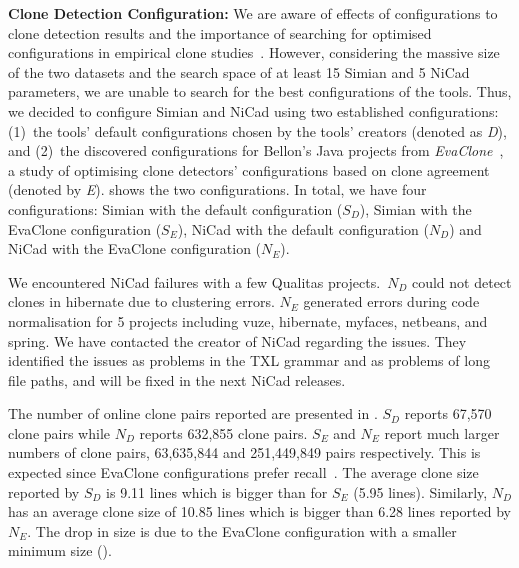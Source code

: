 \documentclass[sigconf,review, anonymous]{acmart}
\begin{document}
\textbf{Clone Detection Configuration: }
We are aware of effects of configurations to clone detection results
and the importance of searching for optimised configurations in
empirical clone
studies~\cite{Svajlenko2014,Wang2014,cr2016ssbse,Ragkhitwetsagul2016}. However,
considering the massive size of the two datasets and the search space
of at least 15 Simian and 5 NiCad parameters, we are unable to search
for the best configurations of the tools. Thus, we decided to
configure Simian and NiCad using two established configurations:
(1)~the tools' default configurations chosen by the tools' creators
(denoted as \textit{D}), and (2)~the discovered configurations for
Bellon's Java projects from \textit{EvaClone}~\cite{Wang2013}, a study
of optimising clone detectors' configurations based on clone agreement
(denoted by \textit{E}).  shows the two configurations.
In total, we have four configurations: Simian with the default
configuration ($S_D$), Simian with the EvaClone configuration ($S_E$), 
NiCad with the default configuration ($N_D$)
and NiCad with the EvaClone configuration ($N_E$).

We encountered NiCad failures with a few Qualitas projects.~$N_D$
could not detect clones in \textsf{hibernate} due to clustering
errors. $N_E$ generated errors during code normalisation for 5
projects including \textsf{vuze}, \textsf{hibernate},
\textsf{myfaces}, \textsf{netbeans}, and \textsf{spring}. We have
contacted the creator of NiCad regarding the issues. They identified
the issues as problems in the TXL grammar and as problems of long file
paths, and will be fixed in the next NiCad releases.

The number of online clone pairs reported %
are presented in . $S_D$ reports 67,570 clone
pairs while $N_D$ reports 632,855 clone pairs. $S_E$ and $N_E$ report
much larger numbers of clone pairs, 63,635,844 and 251,449,849 pairs
respectively. This is expected since EvaClone configurations prefer
recall~\cite{Wang2013}.  The average clone size reported by $S_D$ is
9.11 lines which is bigger than for $S_E$ (5.95 lines). Similarly,
$N_D$ has an average clone size of 10.85 lines which is bigger than
6.28 lines reported by $N_E$. The drop in size is due to the EvaClone
configuration with a smaller minimum size ().
\end{document}
